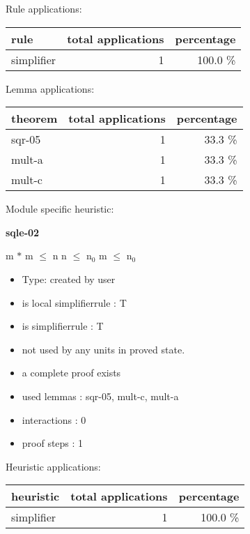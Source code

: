 \documentclass[a4paper]{article}
\begin{document}
Rule applications:

\begin{supertabular}{l|r|r}
rule	        & total applications & percentage \\ \hline
simplifier & 1 & 100.0 \% \\

\end{supertabular}

Lemma applications:

\begin{supertabular}{l|r|r}
theorem	        & total applications & percentage \\ \hline
sqr-05 & 1 & 33.3 \% \\
mult-a & 1 & 33.3 \% \\
mult-c & 1 & 33.3 \% \\

\end{supertabular}

Module specific heuristic:

\pagebreak

{\LARGE\bf sqle-02}\label{lemma-sqle-02}

\medskip

 \Fol m $*$ m $\le$ n \And n $\le$ $\mbox{n}_{0}$ \Imp m $\le$ $\mbox{n}_{0}$

\begin{itemize}

\item Type: created by user

\item is local simplifierrule : T
\item is simplifierrule : T
\item not used by any units in proved state.
\item       a complete proof exists
\item       used lemmas  : sqr-05, mult-c, mult-a
\item       interactions : 0
\item       proof steps  : 1
\end{itemize}

\medskip


Heuristic applications:

\begin{supertabular}{l|r|r}
heuristic	& total applications & percentage \\ \hline
simplifier & 1 & 100.0 \% \\

\end{supertabular}
\end{document}
